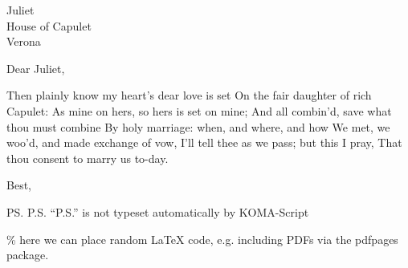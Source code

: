 \documentclass[foldmarks=false,refline=dateleft,fromrule=afteraddress,enlargefirstpage=on,fontsize=12pt,fromalign=center,subject=left,parskip=full]{scrlttr2}
\date{June  4, 2015.}
\begin{document}

\begin{letter}{%
Juliet\\
House of Capulet\\
Verona}

\opening{Dear Juliet,}

Then plainly know my heart's dear love is set
On the fair daughter of rich Capulet:
As mine on hers, so hers is set on mine;
And all combin'd, save what thou must combine
By holy marriage: when, and where, and how
We met, we woo'd, and made exchange of vow,
I'll tell thee as we pass; but this I pray,
That thou consent to marry us to-day.

\closing{Best,}

\ps{P.S. ``P.S.'' is not typeset automatically by KOMA-Script}
\end{letter}

\begin{LaTeX}
\% here we can place random \LaTeX{} code, e.g. including PDFs via the pdfpages package.
\end{LaTeX}
\end{document}
